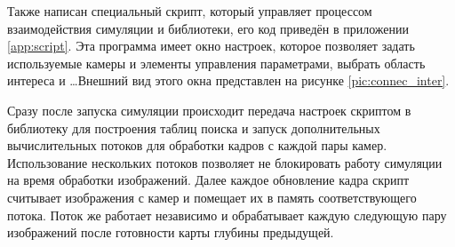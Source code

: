 Также написан специальный скрипт, который управляет процессом взаимодействия симуляции и библиотеки, 
его код приведён в приложении \ref{app:script}. Эта программа имеет окно настроек, которое позволяет задать
используемые камеры и элементы управления параметрами, выбрать область интереса и \dots Внешний вид этого 
окна представлен на рисунке \ref{pic:connec_inter}.


Сразу после запуска симуляции происходит передача настроек скриптом в библиотеку для построения таблиц поиска           %
и запуск дополнительных вычислительных потоков для обработки кадров с каждой пары камер. Использование
нескольких потоков позволяет не блокировать работу симуляции на время обработки изображений.  Далее каждое обновление
кадра скрипт считывает изображения с камер и помещает их в память соответствующего потока. Поток же работает независимо 
и обрабатывает каждую следующую пару изображений после готовности карты глубины предыдущей. 